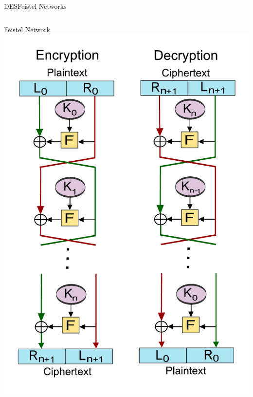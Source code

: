\begin{frame}{DES}{Feistel Networks}
\begin{columns}[onlytextwidth]
{\begin{column}{.41\textwidth}
\begin{block}{Feistel Network}
					\includegraphics[height=.705\textheight]{data/wiki/Feistel}
				\end{block}
			\end{column}
		}
	\end{columns}
\end{frame}

